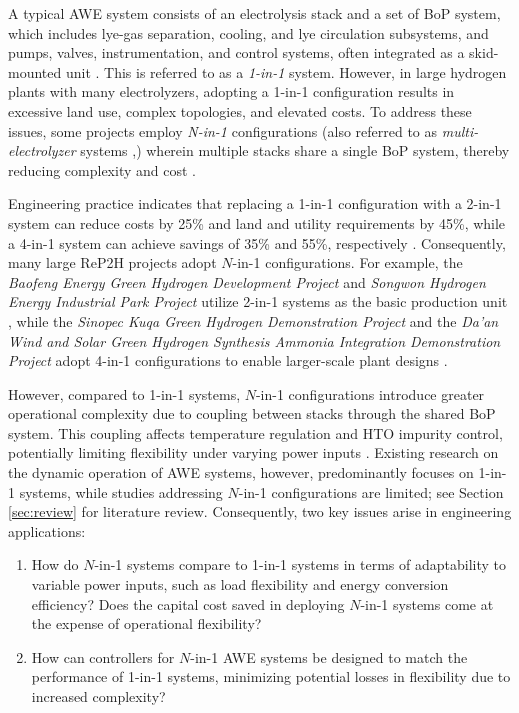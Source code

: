 \documentclass[review,3p,10pt]{elsarticle}
\begin{document}
A typical AWE system consists of an electrolysis stack and a set of BoP system, which includes lye-gas separation, cooling, and lye circulation subsystems, and pumps, valves, instrumentation, and control systems, often integrated as a skid-mounted unit  \cite{emam2024review,niblett2024review}. This is referred to as a \emph{1-in-1} system. However, in large hydrogen plants with many electrolyzers, adopting a 1-in-1 configuration results in excessive land use, complex topologies, and elevated costs. To address these issues, some projects employ \emph{N-in-1} configurations (also referred to as \emph{multi-electrolyzer} systems \cite{liang2024large,li2023exploration},) wherein multiple stacks share a single BoP system, thereby reducing complexity and cost \cite{niblett2024review}.

Engineering practice indicates that replacing a 1-in-1 configuration with a 2-in-1 system can reduce costs by 25\% and land and utility requirements by 45\%, while a 4-in-1 system can achieve savings of 35\% and 55\%, respectively \cite{yang2022application}. Consequently, many large ReP2H projects adopt $N$-in-1 configurations. For example, the \emph{Baofeng Energy Green Hydrogen Development Project} and \emph{Songwon Hydrogen Energy Industrial Park Project} utilize 2-in-1 systems as the basic production unit \cite{meng2024advantages,zhangalkaline}, while the \emph{Sinopec Kuqa Green Hydrogen Demonstration Project} and the \emph{Da'an Wind and Solar Green Hydrogen Synthesis Ammonia Integration Demonstration Project} adopt 4-in-1 configurations to enable larger-scale plant designs \cite{zhangalkaline,zhai2024review}.

However, compared to 1-in-1 systems, $N$-in-1 configurations introduce greater operational complexity due to coupling between stacks through the shared BoP system.
This coupling affects temperature regulation and HTO impurity control, %
potentially limiting flexibility under varying power inputs \cite{rizwan2021design}. Existing research on the dynamic operation of AWE systems, however, %
predominantly focuses on 1-in-1 systems, while studies addressing $N$-in-1 configurations are limited; see Section \ref{sec:review} for literature review. Consequently, two key issues arise in engineering applications:

\begin{enumerate}
  \item How do $N$-in-1 systems compare to 1-in-1 systems in terms of adaptability to variable power inputs, such as load flexibility and energy conversion efficiency? Does the capital cost saved in deploying $N$-in-1 systems come at the expense of operational flexibility?

  \item How can controllers for $N$-in-1 AWE systems be designed to match the performance of 1-in-1 systems, minimizing potential losses in flexibility due to increased complexity?
\end{enumerate}
\end{document}
